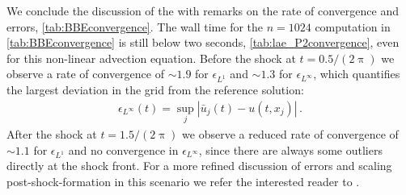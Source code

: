 We conclude the discussion of the \bbe{} with remarks on the rate of convergence and errors, \cf{} \cref{tab:BBEconvergence}.
The wall time for the $n=1024$ computation in \cref{tab:BBEconvergence} is still below two seconds, \cf{} \cref{tab:lae_P2convergence}, even for this non-linear advection equation.
Before the shock at $t=0.5/(2\uppi)$ we observe a rate of convergence of $\sim 1.9$ for $\epsilon_{L^1}$ and $\sim 1.3$ for $\epsilon_{L^\infty}$, which quantifies the largest deviation in the \fv{} grid from the reference solution:
\begin{align}
	\epsilon_{L^\infty}(t)=\sup_j|\bar{u}_j(t)-u(t,x_j)|\,.	\label{eq:Linftyerror}
\end{align}
After the shock at $t=1.5/(2\uppi)$ we observe a reduced rate of convergence of $\sim 1.1$ for $\epsilon_{L^1}$ and no convergence in $\epsilon_{L^\infty}$, since there are always some outliers directly at the shock front. 
For a more refined discussion of errors and scaling post-shock-formation in this scenario we refer the interested reader to .

